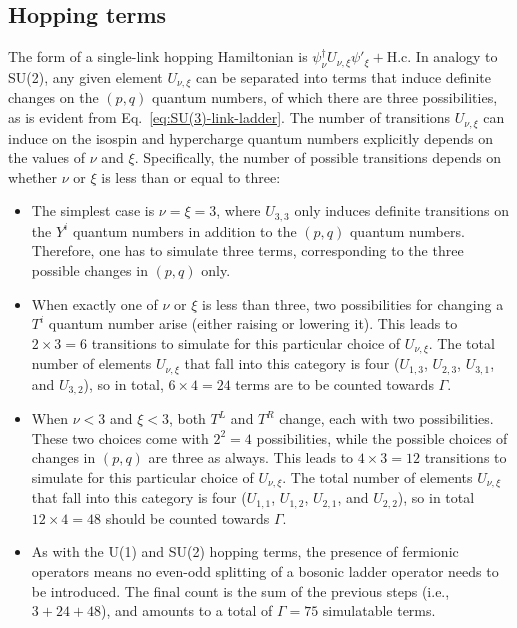 \documentclass[aps,prd,twocolumn,showpacs,groupedaddress,superscriptaddress,nofootinbib,floatfix,preprintnumbers,longbibliography]{revtex4-1}
\begin{document}
\subsection{Hopping terms}
The form of a single-link hopping Hamiltonian is $\psi^\dagger_\nu U_{\nu,\xi} \psi'_{\xi} + \mathrm{H.c.}$ In analogy to SU(2), any given element $U_{\nu,\xi}$ can be separated into terms that induce definite changes on the $(p,q)$ quantum numbers, of which there are three possibilities, as is evident from Eq.~\eqref{eq:SU(3)-link-ladder}. The number of transitions $U_{\nu,\xi}$ can induce on the isospin and hypercharge quantum numbers explicitly depends on the values of $\nu$ and $ \xi $. 
Specifically, the number of possible transitions depends on whether $\nu$ or $\xi$ is less than or equal to three:
%
\begin{itemize}
    \item[$\diamond$] The simplest case is $\nu = \xi = 3$, where $U_{3,3 }$ only induces definite transitions on the $Y^i$ quantum numbers in addition to the $(p,q)$ quantum numbers. Therefore, one has to simulate three terms, corresponding to the three possible changes in $(p,q)$ only.
    \item[$\diamond$] When exactly one of $\nu$ or $\xi$ is less than three, two possibilities for changing a $T^i$ quantum number arise (either raising or lowering it). This leads to $2 \times 3 = 6$ transitions to simulate for this particular choice of $U_{\nu,\xi }$. The total number of elements $U_{\nu,\xi }$ that fall into this category is four ($U_{1,3}$, $U_{2,3}$, $U_{3,1}$, and $U_{3,2}$), so in total, $6 \times 4=24$ terms are to be counted towards $\Gamma$.
    \item[$\diamond$] When $\nu < 3$ and $\xi < 3$, both $T^L$ and $T^R$ change, each with two possibilities. These two choices come with $2^2=4$ possibilities, while the possible choices of changes in $(p,q)$ are three as always. This leads to $4 \times 3 = 12$ transitions to simulate for this particular choice of $U_{\nu,\xi }$. The total number of elements $U_{\nu,\xi }$ that fall into this category is four ($U_{1,1}$, $U_{1,2}$, $U_{2,1}$, and $U_{2,2}$), so in total $12\times4=48$ should be counted towards $\Gamma$.
    \item[$\diamond$] As with the U(1) and SU(2) hopping terms, the presence of fermionic operators means no even-odd splitting of a bosonic ladder operator needs to be introduced. The final count is the sum of the previous steps (i.e., $3+24+48$), and amounts to a total of $\Gamma =75$ simulatable terms.
\end{itemize}
%
\end{document}

